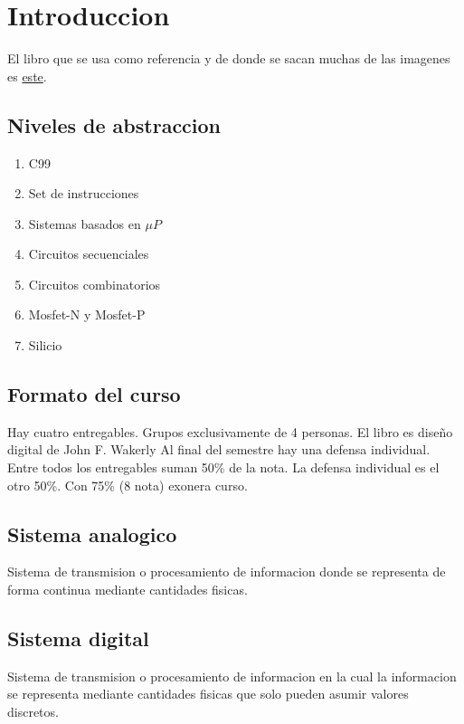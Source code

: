 \documentclass{report}
\begin{document}
\tableofcontents

\chapter{Introduccion}

El libro que se usa como referencia y de donde se sacan muchas de las imagenes es
\href{https://p.urbanpro.com/tv-prod/documents\%2F660-932.2374.file_ref.2588.3001.pdf}{este}.
\section{Niveles de abstraccion}
\begin{enumerate}
	\item C99
	\item Set de instrucciones
	\item Sistemas basados en $\mu P$
	\item Circuitos secuenciales
	\item Circuitos combinatorios
	\item Mosfet-N y Mosfet-P
	\item Silicio
\end{enumerate}

\section{Formato del curso}

Hay cuatro entregables. Grupos exclusivamente de 4 personas.
El libro es diseño digital de John F. Wakerly
Al final del semestre hay una defensa individual.
Entre todos los entregables suman 50\% de la nota. La defensa individual es el otro 50\%. Con 75\% (8 nota) exonera curso.


\section{Sistema analogico}

Sistema de transmision o procesamiento de informacion donde se representa de forma continua mediante cantidades fisicas.

\section{Sistema digital}

Sistema de transmision o procesamiento de informacion en la cual la informacion se representa mediante cantidades fisicas que solo pueden asumir valores discretos.
\end{document}
